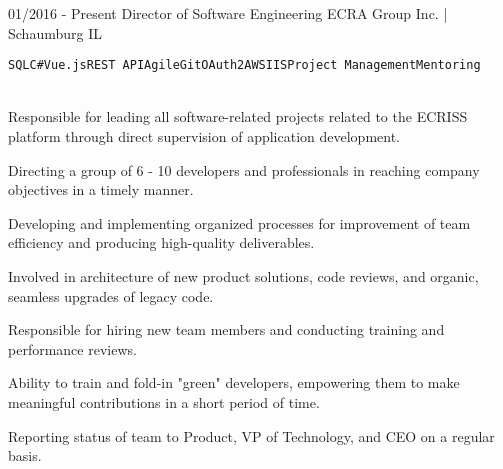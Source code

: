 \documentclass[9pt]{developercv} %
\begin{document}
\begin{entrylist}
	\entry
		{01/2016 - Present}
		{Director of Software Engineering}
		{ECRA Group Inc. | Schaumburg IL}
		{
		 \texttt{SQL}\slashsep\texttt{C\#}\slashsep\texttt{Vue.js}\slashsep\texttt{REST API}\slashsep\texttt{Agile}\slashsep\texttt{Git}\slashsep\texttt{OAuth2}\slashsep\texttt{AWS}\slashsep\texttt{IIS}\slashsep\texttt{Project Management}\slashsep\texttt{Mentoring}\\\
	 \begin{compactitem}
        \item Responsible for leading all software-related projects related to the ECRISS platform through direct supervision of application development.
        \item Directing a group of 6 - 10 developers and professionals in reaching company objectives in a timely manner.
        \item Developing and implementing organized processes for improvement of team efficiency and producing high-quality deliverables. 
        \item   Involved in architecture of new product solutions, code reviews, and organic, seamless upgrades of legacy code. 
        \item Responsible for hiring new team members and conducting training and performance reviews. 
    	\item Ability to train and fold-in "green" developers, empowering them to make meaningful contributions in a short period of time.
        \item Reporting status of team to Product, VP of Technology, and CEO on a regular basis.
    \end{compactitem}
    
}
\end{entrylist}
\end{document}

